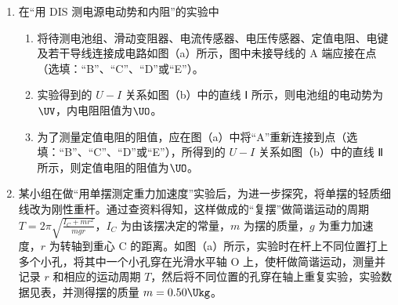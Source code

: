 \documentclass[\gkver]{gaokaozhenti}
\begin{document}
\begin{enumerate}
\item
在“用 DIS 测电源电动势和内阻”的实验中
\begin{enumerate}
	\item
	将待测电池组、滑动变阻器、电流传感器、电压传感器、定值电阻、电键及若干导线连接成电路如图（a）所示，图中未接导线的 A 端应接在点（选填：“B”、“C”、“D”或“E”）。
	\item
	实验得到的 $U-I$ 关系如图（b）中的直线 Ⅰ 所示，则电池组的电动势为$\UV$，内电阻阻值为$\UO$。
	\item
	为了测量定值电阻的阻值，应在图（a）中将“A”重新连接到点（选填：“B”、“C”、“D”或“E”），所得到的 $U-I$ 关系如图（b）中的直线 Ⅱ 所示，则定值电阻的阻值为$\UO$。
\end{enumerate}
{}

\item
某小组在做“用单摆测定重力加速度”实验后，为进一步探究，将单摆的轻质细线改为刚性重杆。通过查资料得知，这样做成的“复摆”做简谐运动的周期 $T = 2\pi\sqrt{\frac{I_{C} + mr^{2}}{mgr}}$，$I_{C}$ 为由该摆决定的常量，$m$ 为摆的质量，$g$ 为重力加速度，$r$ 为转轴到重心 C 的距离。如图（a）所示，实验时在杆上不同位置打上多个小孔，将其中一个小孔穿在光滑水平轴 O 上，使杆做简谐运动，测量并记录 $r$ 和相应的运动周期 $T$，然后将不同位置的孔穿在轴上重复实验，实验数据见表，并测得摆的质量 $m = 0.50\Ukg$。


\end{enumerate}
\end{document}
